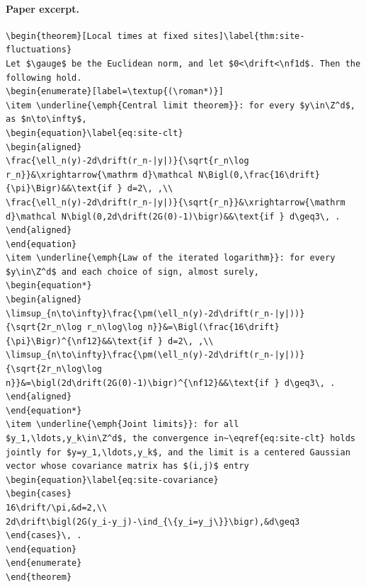 \paragraph{Paper excerpt.}
\begin{verbatim}
\begin{theorem}[Local times at fixed sites]\label{thm:site-fluctuations}
Let $\gauge$ be the Euclidean norm, and let $0<\drift<\nf1d$. Then the following hold.
\begin{enumerate}[label=\textup{(\roman*)}]
\item \underline{\emph{Central limit theorem}}: for every $y\in\Z^d$, as $n\to\infty$,
\begin{equation}\label{eq:site-clt}
\begin{aligned}
\frac{\ell_n(y)-2d\drift(r_n-|y|)}{\sqrt{r_n\log r_n}}&\xrightarrow{\mathrm d}\mathcal N\Bigl(0,\frac{16\drift}{\pi}\Bigr)&&\text{if } d=2\, ,\\
\frac{\ell_n(y)-2d\drift(r_n-|y|)}{\sqrt{r_n}}&\xrightarrow{\mathrm d}\mathcal N\bigl(0,2d\drift(2G(0)-1)\bigr)&&\text{if } d\geq3\, .
\end{aligned}
\end{equation}
\item \underline{\emph{Law of the iterated logarithm}}: for every $y\in\Z^d$ and each choice of sign, almost surely,
\begin{equation*}
\begin{aligned}
\limsup_{n\to\infty}\frac{\pm(\ell_n(y)-2d\drift(r_n-|y|))}{\sqrt{2r_n\log r_n\log\log n}}&=\Bigl(\frac{16\drift}{\pi}\Bigr)^{\nf12}&&\text{if } d=2\, ,\\
\limsup_{n\to\infty}\frac{\pm(\ell_n(y)-2d\drift(r_n-|y|))}{\sqrt{2r_n\log\log n}}&=\bigl(2d\drift(2G(0)-1)\bigr)^{\nf12}&&\text{if } d\geq3\, .
\end{aligned}
\end{equation*}
\item \underline{\emph{Joint limits}}: for all $y_1,\ldots,y_k\in\Z^d$, the convergence in~\eqref{eq:site-clt} holds jointly for $y=y_1,\ldots,y_k$, and the limit is a centered Gaussian vector whose covariance matrix has $(i,j)$ entry
\begin{equation}\label{eq:site-covariance}
\begin{cases}
16\drift/\pi,&d=2,\\
2d\drift\bigl(2G(y_i-y_j)-\ind_{\{y_i=y_j\}}\bigr),&d\geq3
\end{cases}\, .
\end{equation}
\end{enumerate}
\end{theorem}
\end{verbatim}
